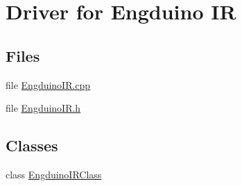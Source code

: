 \hypertarget{group___engduino_i_r}{}\section{Driver for Engduino I\+R}
\label{group___engduino_i_r}
\subsection*{Files}
\begin{DoxyCompactItemize}
\item 
file \hyperlink{_engduino_i_r_8cpp}{Engduino\+I\+R.\+cpp}
\item 
file \hyperlink{_engduino_i_r_8h}{Engduino\+I\+R.\+h}
\end{DoxyCompactItemize}
\subsection*{Classes}
\begin{DoxyCompactItemize}
\item 
class \hyperlink{class_engduino_i_r_class}{Engduino\+I\+R\+Class}
\end{DoxyCompactItemize}
